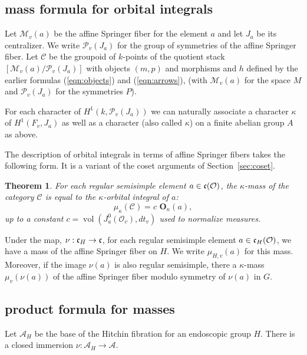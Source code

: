 \documentclass[brochure,english,12pt]{bourbaki}
\newtheorem{theorem}[equation]{Theorem}
\def\op#1{{\operatorname{#1}}}
\def\OO{{\mathbf O}}
\def\cc{\frak{c}}
\def\A{{\mathcal A}}
\def\C{{\mathcal C}}
\def\M{{\mathcal M}}
\def\P{{\mathcal P}}
\def\O{{\mathcal O}}
\begin{document}
\subsection{mass formula for orbital integrals}


Let $\M_v(a)$ be the affine Springer fiber for the element $a$ and let
$J_a$ be its centralizer.  We write $\P_v(J_a)$ for the group of
symmetries of the affine Springer fiber.   Let $\C$ be the groupoid of $k$-points of
the quotient stack $[\M_v(a)/\P_v(J_a)]$ with objects $(m,p)$ and morphisms
and $h$ defined by the earlier formulas (\ref{eqn:objects}) and (\ref{eqn:arrows}),
(with $\M_v(a)$ for the space $M$ and $\P_v(J_a)$ for the symmetries $P$).

For each character of $H^1(k,\P_v(J_a))$ we can naturally associate a
character $\kappa$ of $H^1(F_v,J_a)$ as well as a character (also
called $\kappa$) on a finite abelian group $A$ as above.

The description of orbital integrals in terms of affine Springer fibers
 takes the following form.  It is a variant of the coset arguments of Section~\ref{sec:coset}.


\begin{theorem}\label{lemma:orbital-mass}
For each regular semisimple element $a\in \cc(\O)$, 
the $\kappa$-mass of the category $\C$ is equal to the
$\kappa$-orbital integral of $a$:
\[
\mu_\kappa(\C) = c\,\, \OO_\kappa(a),
\]
up to a constant $c=\op{vol}(J^0_a(\O_v),dt_v)$ used to normalize measures.
\end{theorem}


Under the map, $\nu:\cc_H\to\cc$, for each regular semisimple element $a\in \cc_H(\O)$, 
we have a 
mass  of the affine Springer fiber on $H$. We write $\mu_{H,v}(a)$ for this mass. 
Moreover, if the image $\nu(a)$
is also regular semisimple, there a $\kappa$-mass $\mu_v(\nu(a))$ of the affine Springer
fiber modulo symmetry of $\nu(a)$ in $G$.


\subsection{product formula for masses} 



Let $\A_H$ be the base of the Hitchin fibration for an endoscopic group $H$.  There
is a closed immersion $\nu:\A_H\to\A$.
\end{document}
